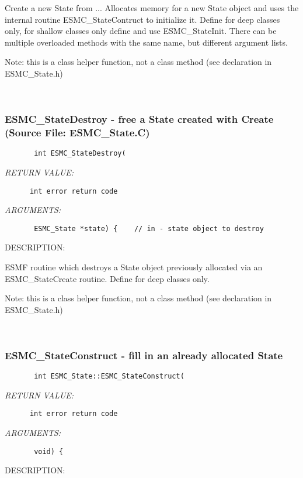         Create a new State from ... Allocates memory for a new State
        object and uses the internal routine ESMC\_StateContruct to
        initialize it.  Define for deep classes only, for shallow classes only
        define and use ESMC\_StateInit.
        There can be multiple overloaded methods with the same name, but
        different argument lists.
  
        Note: this is a class helper function, not a class method
        (see declaration in ESMC\_State.h)
   
 
\mbox{}\hrulefill\ 
 
\subsubsection{ESMC\_StateDestroy - free a State created with Create (Source File: ESMC\_State.C)}


  
\begin{verbatim}       int ESMC_StateDestroy(\end{verbatim}{\em RETURN VALUE:}
\begin{verbatim}      int error return code\end{verbatim}{\em ARGUMENTS:}
\begin{verbatim}       ESMC_State *state) {    // in - state object to destroy\end{verbatim}
{\sf DESCRIPTION:\\ }


        ESMF routine which destroys a State object previously allocated
        via an ESMC\_StateCreate routine.  Define for deep classes only.
  
        Note: this is a class helper function, not a class method
        (see declaration in ESMC\_State.h)
   
 
\mbox{}\hrulefill\ 
 
\subsubsection{ESMC\_StateConstruct - fill in an already allocated State}


  
\begin{verbatim}       int ESMC_State::ESMC_StateConstruct(\end{verbatim}{\em RETURN VALUE:}
\begin{verbatim}      int error return code\end{verbatim}{\em ARGUMENTS:}
\begin{verbatim}       void) {\end{verbatim}
{\sf DESCRIPTION:\\ }


